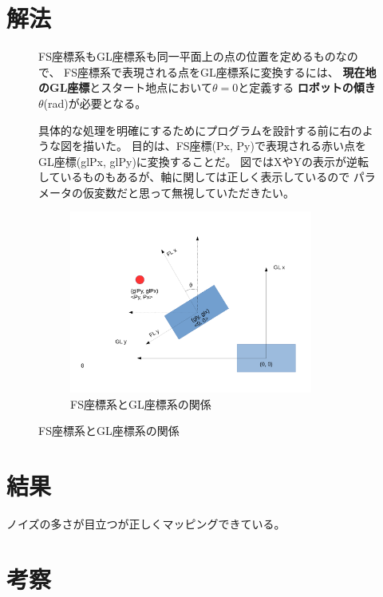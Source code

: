 \documentclass[main]{subfiles}
\begin{document}
\section{解法}
\begin{figure}[H]
	\begin{minipage}{0.5\hsize}
		\setlength{\parindent}{1\Cwd}
		FS座標系もGL座標系も同一平面上の点の位置を定めるものなので、
		FS座標系で表現される点をGL座標系に変換するには、
		\textbf{現在地のGL座標}とスタート地点において$\theta = 0$と定義する
		\textbf{ロボットの傾き$\theta$}(rad)が必要となる。

		具体的な処理を明確にするためにプログラムを設計する前に右のような図を描いた。
		目的は、FS座標(Px, Py)で表現される赤い点をGL座標(glPx, glPy)に変換することだ。
		図ではXやYの表示が逆転しているものもあるが、軸に関しては正しく表示しているので
		パラメータの仮変数だと思って無視していただきたい。
	\end{minipage}
	\begin{minipage}{0.5\hsize}
		\begin{figure}[H]
			\centering
			\includegraphics[width=8cm]{./trans.pdf}
			\caption{FS座標系とGL座標系の関係}
		\end{figure}
	\end{minipage}
\end{figure}

\section{結果}
ノイズの多さが目立つが正しくマッピングできている。

\section{考察}
\end{document}
